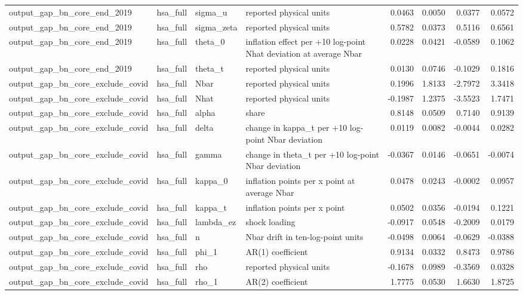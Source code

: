 \begin{tabular}{llllrrrr}
output\_gap\_bn\_core\_end\_2019 & hsa\_full & sigma\_u & reported physical units & 0.0463 & 0.0050 & 0.0377 & 0.0572 \\
output\_gap\_bn\_core\_end\_2019 & hsa\_full & sigma\_zeta & reported physical units & 0.5782 & 0.0373 & 0.5116 & 0.6561 \\
output\_gap\_bn\_core\_end\_2019 & hsa\_full & theta\_0 & inflation effect per +10 log-point Nhat deviation at average Nbar & 0.0228 & 0.0421 & -0.0589 & 0.1062 \\
output\_gap\_bn\_core\_end\_2019 & hsa\_full & theta\_t & reported physical units & 0.0130 & 0.0746 & -0.1029 & 0.1816 \\
output\_gap\_bn\_core\_exclude\_covid & hsa\_full & Nbar & reported physical units & 0.1996 & 1.8133 & -2.7972 & 3.3418 \\
output\_gap\_bn\_core\_exclude\_covid & hsa\_full & Nhat & reported physical units & -0.1987 & 1.2375 & -3.5523 & 1.7471 \\
output\_gap\_bn\_core\_exclude\_covid & hsa\_full & alpha & share & 0.8148 & 0.0509 & 0.7140 & 0.9139 \\
output\_gap\_bn\_core\_exclude\_covid & hsa\_full & delta & change in kappa\_t per +10 log-point Nbar deviation & 0.0119 & 0.0082 & -0.0044 & 0.0282 \\
output\_gap\_bn\_core\_exclude\_covid & hsa\_full & gamma & change in theta\_t per +10 log-point Nbar deviation & -0.0367 & 0.0146 & -0.0651 & -0.0074 \\
output\_gap\_bn\_core\_exclude\_covid & hsa\_full & kappa\_0 & inflation points per x point at average Nbar & 0.0478 & 0.0243 & -0.0002 & 0.0957 \\
output\_gap\_bn\_core\_exclude\_covid & hsa\_full & kappa\_t & inflation points per x point & 0.0502 & 0.0356 & -0.0194 & 0.1221 \\
output\_gap\_bn\_core\_exclude\_covid & hsa\_full & lambda\_ez & shock loading & -0.0917 & 0.0548 & -0.2009 & 0.0179 \\
output\_gap\_bn\_core\_exclude\_covid & hsa\_full & n & Nbar drift in ten-log-point units & -0.0498 & 0.0064 & -0.0629 & -0.0388 \\
output\_gap\_bn\_core\_exclude\_covid & hsa\_full & phi\_1 & AR(1) coefficient & 0.9134 & 0.0332 & 0.8473 & 0.9786 \\
output\_gap\_bn\_core\_exclude\_covid & hsa\_full & rho & reported physical units & -0.1678 & 0.0989 & -0.3569 & 0.0328 \\
output\_gap\_bn\_core\_exclude\_covid & hsa\_full & rho\_1 & AR(2) coefficient & 1.7775 & 0.0530 & 1.6630 & 1.8725 \\

\end{tabular}
